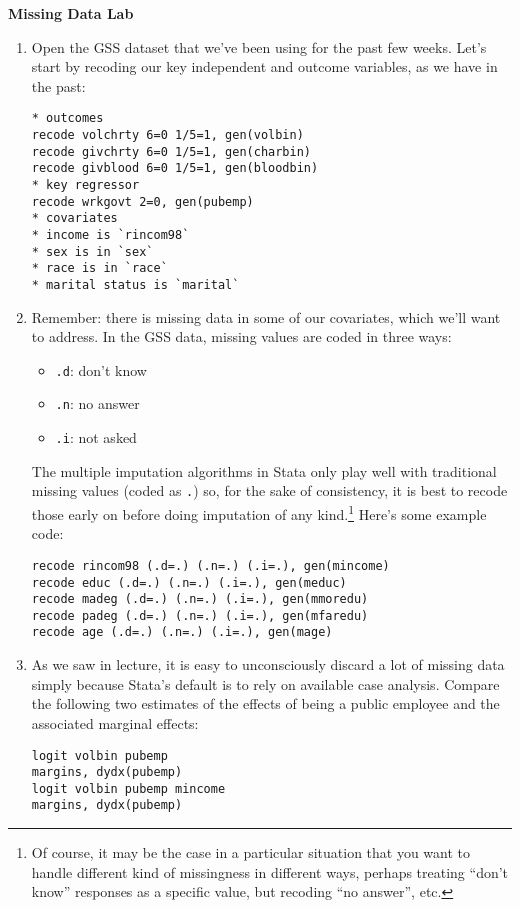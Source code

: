 \documentclass[a4paper,12pt]{article}
\begin{document}
\begin{center}
\textbf{Missing Data Lab}
\end{center}


\begin{enumerate}\itemsep0.5em

\subsection*{The Problem}

\item Open the GSS dataset that we've been using for the past few weeks. Let's start by recoding our key independent and outcome variables, as we have in the past:
\begin{verbatim}
* outcomes
recode volchrty 6=0 1/5=1, gen(volbin)
recode givchrty 6=0 1/5=1, gen(charbin)
recode givblood 6=0 1/5=1, gen(bloodbin)
* key regressor
recode wrkgovt 2=0, gen(pubemp)
* covariates
* income is `rincom98`
* sex is in `sex`
* race is in `race`
* marital status is `marital`
\end{verbatim}

\item Remember: there is missing data in some of our covariates, which we'll want to address. In the GSS data, missing values are coded in three ways:
	\begin{itemize}
	\item \texttt{.d}: don't know
	\item \texttt{.n}: no answer
	\item \texttt{.i}: not asked
	\end{itemize}
The multiple imputation algorithms in Stata only play well with traditional missing values (coded as \texttt{.}) so, for the sake of consistency, it is best to recode those early on before doing imputation of any kind.\footnote{Of course, it may be the case in a particular situation that you want to handle different kind of missingness in different ways, perhaps treating ``don't know'' responses as a specific value, but recoding ``no answer'', etc.} Here's some example code:
\begin{verbatim}
recode rincom98 (.d=.) (.n=.) (.i=.), gen(mincome)
recode educ (.d=.) (.n=.) (.i=.), gen(meduc)
recode madeg (.d=.) (.n=.) (.i=.), gen(mmoredu)
recode padeg (.d=.) (.n=.) (.i=.), gen(mfaredu)
recode age (.d=.) (.n=.) (.i=.), gen(mage)
\end{verbatim}


\item As we saw in lecture, it is easy to unconsciously discard a lot of missing data simply because Stata's default is to rely on available case analysis. Compare the following two estimates of the effects of being a public employee and the associated marginal effects:
\begin{verbatim}
logit volbin pubemp
margins, dydx(pubemp)
logit volbin pubemp mincome
margins, dydx(pubemp)
\end{verbatim}


\end{enumerate}
\end{document}
